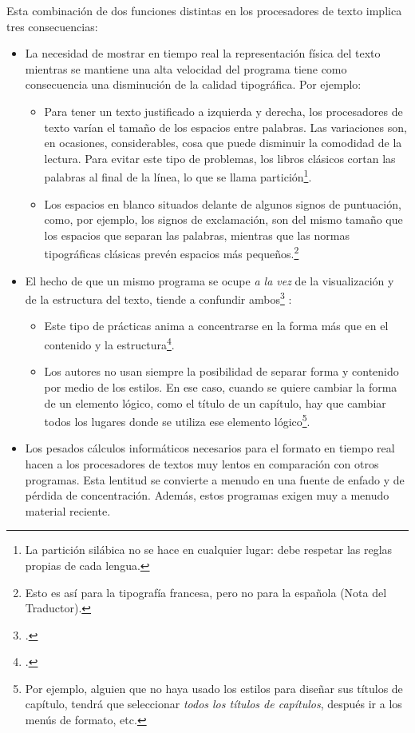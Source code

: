 Esta combinación de dos funciones distintas en los procesadores de texto implica tres consecuencias:
\begin{itemize}
\item La necesidad de mostrar en tiempo real la representación física del texto mientras se mantiene una alta velocidad del programa tiene como consecuencia una disminución de la calidad tipográfica. Por ejemplo:
	\begin{itemize}
	\item Para tener un texto justificado a izquierda y derecha, los procesadores de texto varían el tamaño de los espacios entre palabras. Las variaciones son, en ocasiones, considerables, cosa que puede disminuir la comodidad de la lectura. Para evitar este tipo de problemas, los libros clásicos cortan las palabras al final de la línea, lo que se llama partición\footnote{La partición silábica no se hace en cualquier lugar: debe respetar las reglas propias de cada lengua.}.
\item Los espacios en blanco situados delante de algunos signos de puntuación, como, por ejemplo, los signos de exclamación, son del mismo tamaño que los espacios que separan las palabras, mientras que las normas tipográficas clásicas prevén espacios más pequeños.\footnote{Esto es así para la tipografía francesa, pero no para la española (Nota del Traductor).}
	\end{itemize}
\item El hecho de que un mismo programa se ocupe \emph{a la vez} de la visualización y de la estructura del texto, tiende a confundir ambos\footcite[El autor de estas líneas es menos reticente a los procesadores de texto que otros LaTeXeros : \cf][]{stupide}  :
	\begin{itemize}
\item Este tipo de prácticas anima a concentrarse en la forma más que en el contenido y la estructura\footcite[No obstante, en teoría, la formación universitaria en humanidades anima a pensar \emph{primero, estructura y sentido}. Véase una discusión en el blog del autor:][]{structurevsforme}. 
\item Los autores no usan siempre la posibilidad de separar forma y contenido por medio de los estilos. En ese caso, cuando se quiere cambiar la forma de un elemento lógico, como el título de un capítulo, hay que cambiar todos los lugares donde se utiliza ese elemento lógico\footnote{Por ejemplo, alguien que no haya usado los estilos para diseñar sus títulos de capítulo, tendrá que seleccionar \emph{todos los títulos de capítulos}, después ir a los menús de formato, etc.}.
	\end{itemize}
\item Los pesados cálculos informáticos necesarios para el formato en tiempo real hacen a los procesadores de textos muy lentos en comparación con otros programas. Esta lentitud se convierte a menudo en una fuente de enfado y de pérdida de concentración. Además, estos programas exigen muy a menudo material reciente.
\end{itemize}

